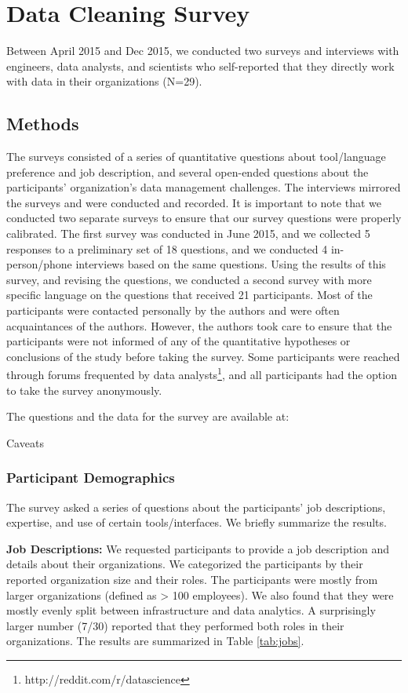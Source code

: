 \section{Data Cleaning Survey}
Between April 2015 and Dec 2015, we conducted two surveys and interviews with engineers, data analysts, and scientists who self-reported that they directly work with data in their organizations (N=29).

\subsection{Methods}\label{sec:survey}
The surveys consisted of a series of quantitative questions about tool/language preference and job description, and several open-ended questions about the participants' organization's data management challenges. The interviews mirrored the surveys and were conducted and recorded. It is important to note that we conducted two separate surveys to ensure that our survey questions were properly calibrated. The first survey was conducted in June 2015, and we collected 5 responses to a preliminary set of 18 questions, and we conducted 4 in-person/phone interviews based on the same questions. Using the results of this survey, and revising the questions, we conducted a second survey with more specific language on the questions that received 21 participants. 
Most of the participants were contacted personally by the authors and were often acquaintances of the authors. However, the authors took care to ensure that the participants were not informed of any of the quantitative hypotheses or conclusions of the study before taking the survey. 
Some participants were reached through forums frequented by data analysts\footnote{http://reddit.com/r/datascience}, and all participants had the option to take the survey anonymously.

The questions and the data for the survey are available at: 
{}

Caveats

\subsubsection{Participant Demographics}
The survey asked a series of questions about the participants' job descriptions, expertise, and use of certain tools/interfaces.
We briefly summarize the results.

\vspace{0.5em}

\noindent\textbf{Job Descriptions: } We requested participants to provide a job description and details about their organizations. We categorized the participants by their reported organization size and their roles. The participants were mostly from larger organizations (defined as > 100 employees). We also found that they were mostly evenly split between infrastructure and data analytics. A surprisingly larger number (7/30) reported that they performed both roles in their organizations. The results are summarized in Table \ref{tab:jobs}. 


